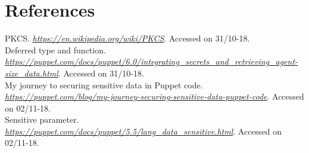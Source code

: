 \newpage
\section{References}

PKCS.
\textit{\url{https://en.wikipedia.org/wiki/PKCS}}.
Accessed on 31/10-18.
\\

Deferred type and function.
\textit{\url{https://puppet.com/docs/puppet/6.0/integrating_secrets_and_retrieving_agent-size_data.html}}.
Accessed on 31/10-18.
\\

My journey to securing sensitive data in Puppet code.
\textit{\url{https://puppet.com/blog/my-journey-securing-sensitive-data-puppet-code}}. Accessed on 02/11-18.
\\

Sensitive parameter.
\textit{\url{https://puppet.com/docs/puppet/5.5/lang\_data\_sensitive.html}}. Accessed on 02/11-18.
\\




\clearpage
\appendix

